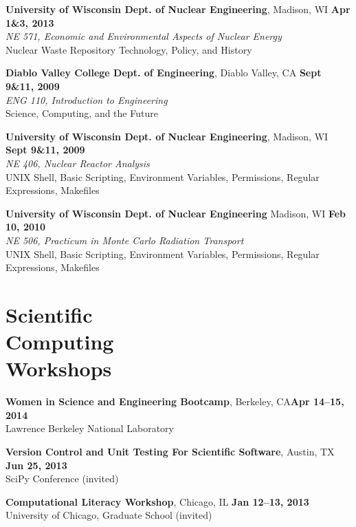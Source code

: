 \documentclass[margin,line]{resume}
\begin{document}
\begin{resume}
    \textbf{University of Wisconsin Dept. of Nuclear Engineering}, Madison, WI \hfill \textbf{Apr 1\&3, 2013}\\ 
               \textsl{NE 571, Economic and Environmental Aspects of Nuclear Energy}\\
               Nuclear Waste Repository Technology, Policy, and History

    \textbf{Diablo Valley College Dept. of Engineering}, Diablo Valley, CA \hfill \textbf{Sept 9\&11, 2009}\\ 
               \textsl{ENG 110, Introduction to Engineering}\\
               Science, Computing, and the Future

    \textbf{University of Wisconsin Dept. of Nuclear Engineering}, Madison, WI \hfill \textbf{Sept 9\&11, 2009}\\ 
               \textsl{NE 406, Nuclear Reactor Analysis}\\
               UNIX Shell, Basic Scripting, Environment Variables, Permissions, Regular Expressions, Makefiles 

    \textbf{University of Wisconsin Dept. of Nuclear Engineering} Madison, WI \hfill \textbf{Feb 10, 2010}\\ 
               \textsl{NE 506, Practicum in Monte Carlo Radiation Transport}\\
               UNIX Shell, Basic Scripting, Environment Variables, Permissions, Regular Expressions, Makefiles 

    \section{\mysidestyle Scientific\\Computing\\Workshops}
    \textbf{Women in Science and Engineering Bootcamp}, Berkeley, CA\hfill \textbf{Apr 14--15, 2014}\\
               Lawrence Berkeley National Laboratory

    \textbf{Version Control and Unit Testing For Scientific Software}, Austin, TX \hfill \textbf{Jun 25, 2013}\\
               SciPy Conference (invited)

    \textbf{Computational Literacy Workshop}, Chicago, IL \hfill \textbf{Jan 12--13, 2013}\\
               University of Chicago, Graduate School (invited)


\end{resume}
\end{document}
